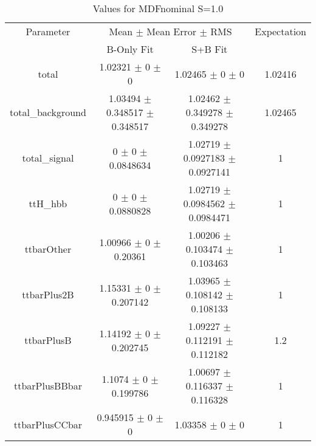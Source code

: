 \begin{table}
\centering
\caption{Values for MDFnominal S=1.0}
\begin{tabular}{cccc}
\toprule
Parameter & \multicolumn{2}{c}{Mean $\pm$ Mean Error $\pm$ RMS} & Expectation\\
 & B-Only Fit & S+B Fit & \\
\midrule
total & \num{1.02321} $\pm$ \num{0} $\pm$ \num{0} & \num{1.02465} $\pm$ \num{0} $\pm$ \num{0} & \num{1.02416}\\
total\_background & \num{1.03494} $\pm$ \num{0.348517} $\pm$ \num{0.348517} & \num{1.02462} $\pm$ \num{0.349278} $\pm$ \num{0.349278} & \num{1.02465}\\
total\_signal & \num{0} $\pm$ \num{0} $\pm$ \num{0.0848634} & \num{1.02719} $\pm$ \num{0.0927183} $\pm$ \num{0.0927141} & \num{1}\\
ttH\_hbb & \num{0} $\pm$ \num{0} $\pm$ \num{0.0880828} & \num{1.02719} $\pm$ \num{0.0984562} $\pm$ \num{0.0984471} & \num{1}\\
ttbarOther & \num{1.00966} $\pm$ \num{0} $\pm$ \num{0.20361} & \num{1.00206} $\pm$ \num{0.103474} $\pm$ \num{0.103463} & \num{1}\\
ttbarPlus2B & \num{1.15331} $\pm$ \num{0} $\pm$ \num{0.207142} & \num{1.03965} $\pm$ \num{0.108142} $\pm$ \num{0.108133} & \num{1}\\
ttbarPlusB & \num{1.14192} $\pm$ \num{0} $\pm$ \num{0.202745} & \num{1.09227} $\pm$ \num{0.112191} $\pm$ \num{0.112182} & \num{1.2}\\
ttbarPlusBBbar & \num{1.1074} $\pm$ \num{0} $\pm$ \num{0.199786} & \num{1.00697} $\pm$ \num{0.116337} $\pm$ \num{0.116328} & \num{1}\\
ttbarPlusCCbar & \num{0.945915} $\pm$ \num{0} $\pm$ \num{0} & \num{1.03358} $\pm$ \num{0} $\pm$ \num{0} & \num{1}\\
\bottomrule
\end{tabular}
\end{table}